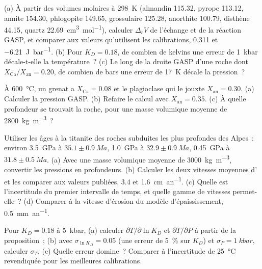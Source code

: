\begin{exercise}[$\star\star$]\label{exo:b2:pt-paths:6}
(a) À partir des volumes molaires à \qty{298}{K} (almandin 115.32, pyrope 113.12, annite
154.30, phlogopite 149.65, grossulaire 125.28, anorthite 100.79, disthène 44.15, quartz
\qty{22.69}{cm^3.mol^{-1}}), calculer $\Delta_r V$ de l'échange et de la réaction GASP,
et comparer aux valeurs qu'utilisent les calibrations, \num{0.311} et
\qty{-6.21}{J.bar^{-1}}. (b) Pour $K_D = 0.18$, de combien de kelvins une erreur de
\qty{1}{kbar} décale-t-elle la température~? (c) Le long de la droite GASP d'une roche dont
$X_{\text{Ca}}/X_{\text{an}} = 0.20$, de combien de bars une erreur de \qty{17}{K} décale
la pression~?
\end{exercise}

\begin{exercise}[$\star\star$]\label{exo:b2:pt-paths:7}
À \qty{600}{\celsius}, un grenat a $X_{\text{Ca}} = 0.08$ et le plagioclase qui le jouxte
$X_{\text{an}} = 0.30$. (a) Calculer la pression GASP. (b) Refaire le calcul avec $X_{\text{an}} =
0.35$. (c) À quelle profondeur se trouvait la roche, pour une masse volumique moyenne de \qty{2800}{kg.m^{-3}}~?
\end{exercise}

\begin{exercise}[$\star\star$]\label{exo:b2:pt-paths:8}
Utiliser les âges à la titanite des roches subduites les plus profondes des Alpes~: environ \qty{3.5}{GPa} à
$35.1 \pm \qty{0.9}{Ma}$, \qty{1.0}{GPa} à $32.9 \pm \qty{0.9}{Ma}$, \qty{0.45}{GPa} à
$31.8 \pm \qty{0.5}{Ma}$. (a) Avec une masse volumique moyenne de \qty{3000}{kg.m^{-3}}, convertir les
pressions en profondeurs. (b) Calculer les deux vitesses moyennes d' et les comparer aux
valeurs publiées, 3.4 et \qty{1.6}{cm.an^{-1}}. (c) Quelle est l'incertitude du premier intervalle de temps,
et quelle gamme de vitesses permet-elle~? (d) Comparer à la vitesse d'érosion du
modèle d'épaississement, \qty{0.5}{mm.an^{-1}}.
\end{exercise}

\begin{exercise}[$\star\star$]\label{exo:b2:pt-paths:9}
Pour $K_D = 0.18$ à \qty{5}{kbar}, (a) calculer $\partial T/\partial\ln K_D$ et
$\partial T/\partial P$ à partir de la proposition~; (b) avec $\sigma_{\ln K_D} = 0.05$ (une
erreur de \qty{5}{\percent} sur $K_D$) et $\sigma_P = \qty{1}{kbar}$, calculer $\sigma_T$.
(c) Quelle erreur domine~? Comparer à l'incertitude de \qty{25}{\celsius} revendiquée pour
les meilleures calibrations.
\end{exercise}

